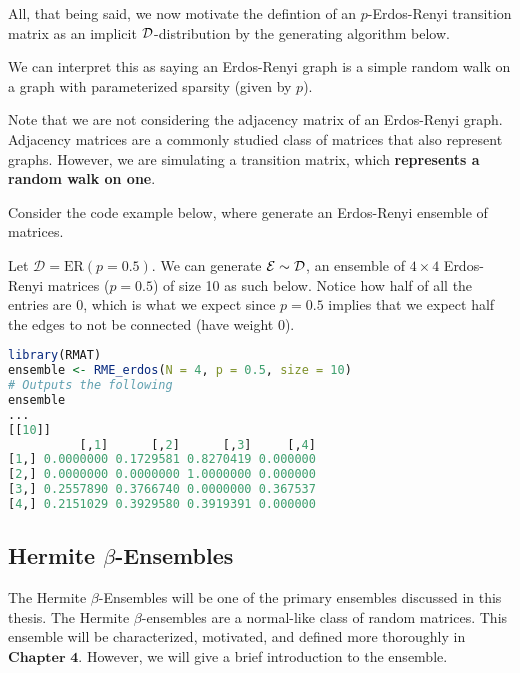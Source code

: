 All, that being said, we now motivate the defintion of an $p$-Erdos-Renyi transition matrix as an implicit $\mathcal{D}$-distribution by the generating algorithm below.

\ALGerdos

We can interpret this as saying an Erdos-Renyi graph is a simple random walk on a graph with parameterized sparsity (given by $p$).

\begin{warning}
Note that we are not considering the adjacency matrix of an Erdos-Renyi graph. Adjacency matrices are a commonly studied class of matrices that also represent graphs.
However, we are simulating a transition matrix, which \textbf{represents a random walk on one}.
\end{warning}

Consider the code example below, where generate an Erdos-Renyi ensemble of matrices.

\begin{code}[Erdos-Renyi p = 0.5 Ensemble]
Let $\mathcal{D} = \text{ER}(p = 0.5)$. We can generate $\mathcal{E} \sim \mathcal{D}$, an ensemble of $4 \times 4$ Erdos-Renyi matrices ($p = 0.5$) of size 10 as such below.
Notice how half of all the entries are $0$, which is what we expect since $p = 0.5$ implies that we expect half the edges to not be connected (have weight 0).
\end{code}

\begin{lstlisting}[language=R]
library(RMAT)
ensemble <- RME_erdos(N = 4, p = 0.5, size = 10)
# Outputs the following
ensemble
...
[[10]]
          [,1]      [,2]      [,3]     [,4]
[1,] 0.0000000 0.1729581 0.8270419 0.000000
[2,] 0.0000000 0.0000000 1.0000000 0.000000
[3,] 0.2557890 0.3766740 0.0000000 0.367537
[4,] 0.2151029 0.3929580 0.3919391 0.000000
\end{lstlisting}


\subsection{Hermite $\beta$-Ensembles}

The Hermite $\beta$-Ensembles will be one of the primary ensembles discussed in this thesis. The Hermite $\beta$-ensembles are a normal-like class of random matrices.
This ensemble will be characterized, motivated, and defined more thoroughly in $\textbf{Chapter 4}$. However, we will give a brief introduction to the ensemble.

